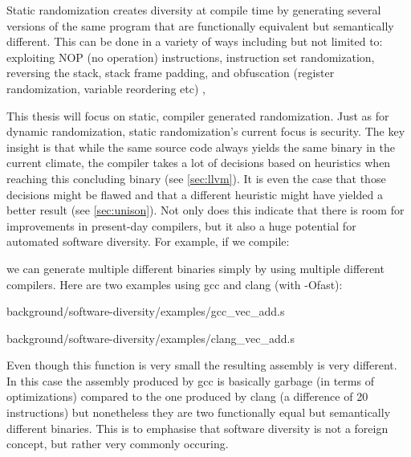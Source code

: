Static randomization creates diversity at compile time by generating several versions of the
same program that are functionally equivalent but semantically different. This can be done
in a variety of ways including but not limited to: exploiting NOP (no operation) instructions,
instruction set randomization, reversing the stack, stack frame padding,
and obfuscation (register randomization, variable reordering etc)
\cite{survey, compiler-generated-sw-div},

This thesis will focus on static, compiler generated randomization. Just as for dynamic
randomization, static randomization's current focus is security. The key insight is that
while the same source code always yields the same binary in the current climate, the compiler
takes a lot of decisions based on heuristics when reaching this concluding binary (see \ref{sec:llvm}).
It is even the case that those decisions might be flawed and that a different heuristic
might have yielded a better result (see \ref{sec:unison}). Not only does this indicate
that there is room for improvements in present-day compilers, but it also a huge potential
for automated software diversity. For example, if we compile:



we can generate multiple different binaries simply by using multiple different compilers.
Here are two examples using gcc and clang (with -Ofast):


{background/software-diversity/examples/gcc_vec_add.s}


{background/software-diversity/examples/clang_vec_add.s}

Even though this function is very small the resulting assembly is very different. In this
case the assembly produced by gcc is basically garbage (in terms of optimizations)
compared to the one produced by clang (a difference of 20 instructions) but nonetheless
they are two functionally equal but semantically different binaries. This is to emphasise
that software diversity is not a foreign concept, but rather very commonly occuring.

